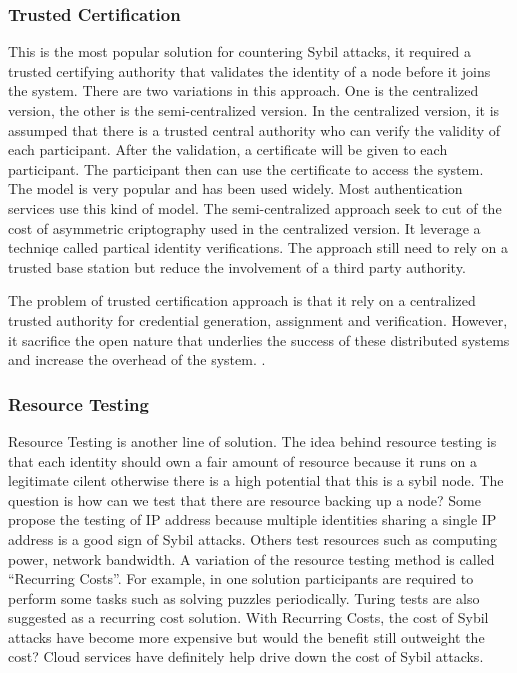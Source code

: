 \documentclass[conference]{IEEEtran}
\begin{document}
\subsubsection{Trusted Certification}
This is the most popular solution for countering Sybil attacks, it required a trusted certifying authority that validates the identity of a node before it joins the system. There are two variations in this approach. One is the centralized version, the other is the semi-centralized version. In the centralized version, it is assumped that there is a trusted central authority who can verify the validity of each participant. After the validation, a certificate will be given to each participant. The participant then can use the certificate to access the system. The model is very popular and has been used widely. Most authentication services use this kind of model. The semi-centralized approach seek to cut of the cost of asymmetric criptography used in the centralized version. It leverage a techniqe called partical identity verifications. The approach still need to rely on a trusted base station but reduce the involvement of a third party authority.

The problem of  trusted certification approach is that it rely on a centralized trusted authority for credential generation, assignment and verification. However, it sacrifice the open nature that underlies the success of these distributed systems and increase the overhead of the system. \cite{newsome04sybil}\cite{Castro02Secure}\cite{Adya02FFA}.

\subsubsection{Resource Testing}
Resource Testing is another line of solution. The idea behind resource testing is that each identity should own a fair amount of resource because it runs on a legitimate cilent otherwise there is a high potential that this is a sybil node. The question is how can we test that there are resource backing up a node? Some propose the testing of IP address because multiple identities sharing a single IP address is a good sign of Sybil attacks. Others test resources such as computing power, network bandwidth. A variation of the resource testing method is called “Recurring Costs”. For example, in one solution participants are required to perform some tasks such as solving puzzles\cite{Borisov06CPS} periodically. Turing tests are also suggested as a recurring cost solution\cite{Ahn03CUH}. With Recurring Costs, the cost of Sybil attacks have become more expensive but would the benefit still outweight the cost? Cloud services have definitely help drive down the cost of Sybil attacks.
\end{document}
